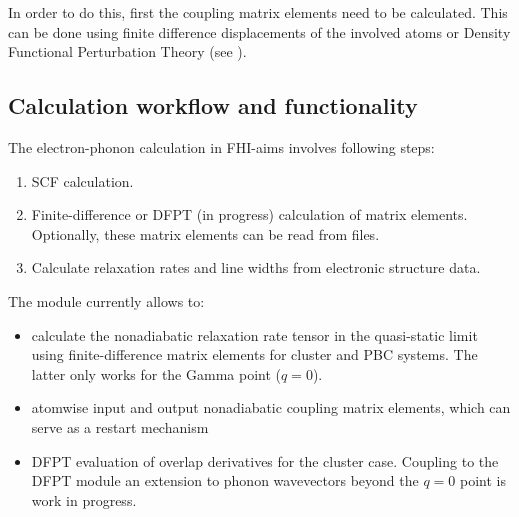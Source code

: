 In order to do this, first the coupling matrix elements need to be calculated. This can be done using finite difference displacements of the involved atoms or Density Functional Perturbation Theory (see ). 






\subsection*{Calculation workflow and functionality}

The electron-phonon calculation in FHI-aims involves following steps:
\begin{enumerate}
 \item SCF calculation.
 \item Finite-difference or DFPT (in progress) calculation of matrix elements. Optionally, these matrix elements can be read from files.
 \item Calculate relaxation rates and line widths from electronic structure data.
\end{enumerate}

The module currently allows to:
\begin{itemize}
 \item calculate the nonadiabatic relaxation rate tensor in the quasi-static limit using finite-difference matrix elements for cluster and PBC systems. The latter only works for the Gamma point ($q=0$).
 \item atomwise input and output nonadiabatic coupling matrix elements, which can serve as a restart mechanism
 \item DFPT evaluation of overlap derivatives for the cluster case. Coupling to the DFPT module an extension to phonon wavevectors beyond the $q=0$ point is work in progress.
\end{itemize}

